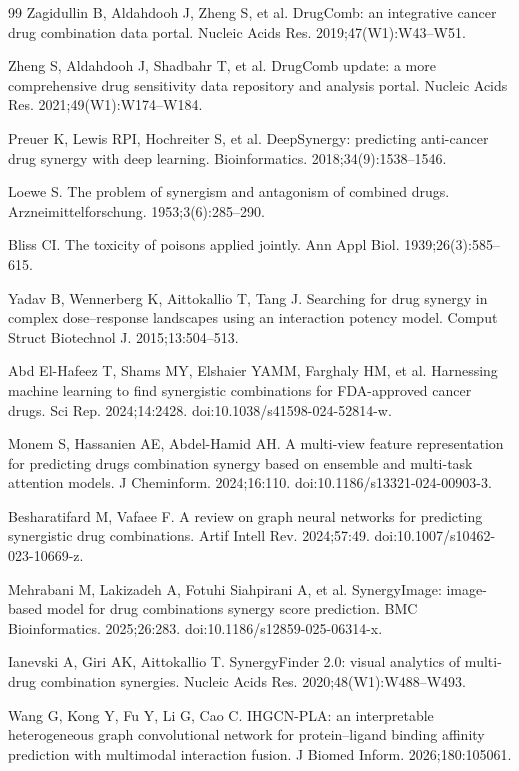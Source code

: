 \documentclass{bmcart}
\begin{document}
\begin{backmatter}
\begin{thebibliography}{99}
Zagidullin B, Aldahdooh J, Zheng S, et al.
DrugComb: an integrative cancer drug combination data portal.
Nucleic Acids Res. 2019;47(W1):W43--W51.

Zheng S, Aldahdooh J, Shadbahr T, et al.
DrugComb update: a more comprehensive drug sensitivity data repository and analysis portal.
Nucleic Acids Res. 2021;49(W1):W174--W184.

Preuer K, Lewis RPI, Hochreiter S, et al.
DeepSynergy: predicting anti-cancer drug synergy with deep learning.
Bioinformatics. 2018;34(9):1538--1546.

Loewe S.
The problem of synergism and antagonism of combined drugs.
Arzneimittelforschung. 1953;3(6):285--290.

Bliss CI.
The toxicity of poisons applied jointly.
Ann Appl Biol. 1939;26(3):585--615.

Yadav B, Wennerberg K, Aittokallio T, Tang J.
Searching for drug synergy in complex dose--response landscapes using an interaction potency model.
Comput Struct Biotechnol J. 2015;13:504--513.

Abd El-Hafeez T, Shams MY, Elshaier YAMM, Farghaly HM, et al.
Harnessing machine learning to find synergistic combinations for FDA-approved cancer drugs.
Sci Rep. 2024;14:2428. doi:10.1038/s41598-024-52814-w.

Monem S, Hassanien AE, Abdel-Hamid AH.
A multi-view feature representation for predicting drugs combination synergy based on ensemble and
multi-task attention models. J Cheminform. 2024;16:110. doi:10.1186/s13321-024-00903-3.

Besharatifard M, Vafaee F.
A review on graph neural networks for predicting synergistic drug combinations.
Artif Intell Rev. 2024;57:49. doi:10.1007/s10462-023-10669-z.

Mehrabani M, Lakizadeh A, Fotuhi Siahpirani A, et al.
SynergyImage: image-based model for drug combinations synergy score prediction.
BMC Bioinformatics. 2025;26:283. doi:10.1186/s12859-025-06314-x.

Ianevski A, Giri AK, Aittokallio T.
SynergyFinder 2.0: visual analytics of multi-drug combination synergies.
Nucleic Acids Res. 2020;48(W1):W488--W493.

Wang G, Kong Y, Fu Y, Li G, Cao C.
IHGCN-PLA: an interpretable heterogeneous graph convolutional network for protein--ligand binding
affinity prediction with multimodal interaction fusion.
J Biomed Inform. 2026;180:105061.


\end{thebibliography}
\end{backmatter}
\end{document}
